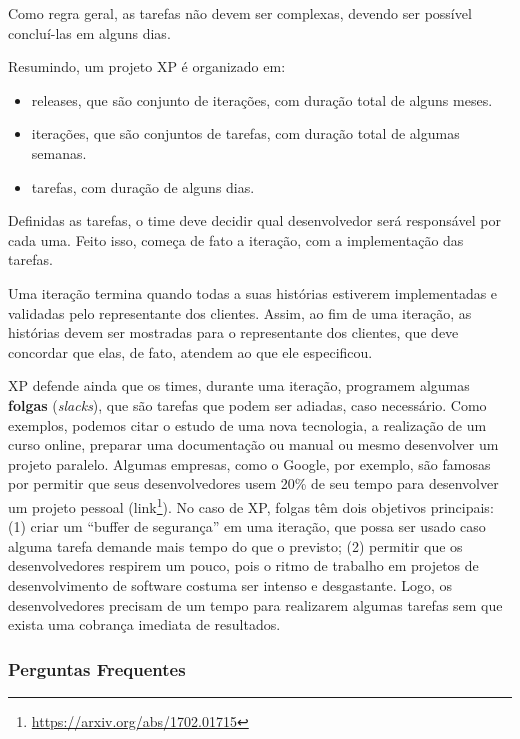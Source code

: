 \documentclass[
  11pt,
  twoside]{book}
\DeclareRobustCommand{\href}[2]{#2\footnote{\url{#1}}}
\begin{document}
Como regra geral, as tarefas não devem ser complexas, devendo ser
possível concluí-las em alguns dias.

Resumindo, um projeto XP é organizado em:

\begin{itemize}
\item
  releases, que são conjunto de iterações, com duração total de alguns
  meses.
\item
  iterações, que são conjuntos de tarefas, com duração total de algumas
  semanas.
\item
  tarefas, com duração de alguns dias.
\end{itemize}

Definidas as tarefas, o time deve decidir qual desenvolvedor será
responsável por cada uma. Feito isso, começa de fato a iteração, com a
implementação das tarefas.

Uma iteração termina quando todas a suas histórias estiverem
implementadas e validadas pelo representante dos clientes. Assim, ao fim
de uma iteração, as histórias devem ser mostradas para o representante
dos clientes, que deve concordar que elas, de fato, atendem ao que ele
especificou.

 XP defende ainda que os times, durante uma iteração,
programem algumas \textbf{folgas} (\emph{slacks}), que são tarefas que
podem ser adiadas, caso necessário. Como exemplos, podemos citar o
estudo de uma nova tecnologia, a realização de um curso online, preparar
uma documentação ou manual ou mesmo desenvolver um projeto paralelo.
Algumas empresas, como o Google, por exemplo, são famosas por permitir
que seus desenvolvedores usem 20\% de seu tempo para desenvolver um
projeto pessoal (\href{https://arxiv.org/abs/1702.01715}{link}). No caso
de XP, folgas têm dois objetivos principais: (1) criar um ``buffer de
segurança'' em uma iteração, que possa ser usado caso alguma tarefa
demande mais tempo do que o previsto; (2) permitir que os
desenvolvedores respirem um pouco, pois o ritmo de trabalho em projetos
de desenvolvimento de software costuma ser intenso e desgastante. Logo,
os desenvolvedores precisam de um tempo para realizarem algumas tarefas
sem que exista uma cobrança imediata de resultados.

\hypertarget{perguntas-frequentes}{%
\subsubsection*{Perguntas Frequentes}\label{perguntas-frequentes}}
\end{document}
